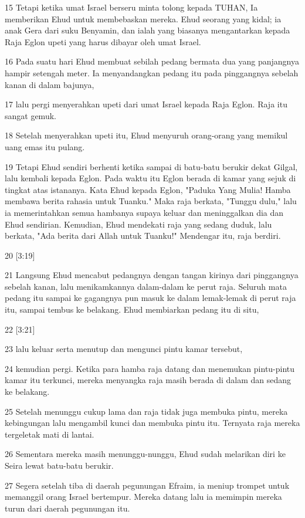 \par 15 Tetapi ketika umat Israel berseru minta tolong kepada TUHAN, Ia memberikan Ehud untuk membebaskan mereka. Ehud seorang yang kidal; ia anak Gera dari suku Benyamin, dan ialah yang biasanya mengantarkan kepada Raja Eglon upeti yang harus dibayar oleh umat Israel.
\par 16 Pada suatu hari Ehud membuat sebilah pedang bermata dua yang panjangnya hampir setengah meter. Ia menyandangkan pedang itu pada pinggangnya sebelah kanan di dalam bajunya,
\par 17 lalu pergi menyerahkan upeti dari umat Israel kepada Raja Eglon. Raja itu sangat gemuk.
\par 18 Setelah menyerahkan upeti itu, Ehud menyuruh orang-orang yang memikul uang emas itu pulang.
\par 19 Tetapi Ehud sendiri berhenti ketika sampai di batu-batu berukir dekat Gilgal, lalu kembali kepada Eglon. Pada waktu itu Eglon berada di kamar yang sejuk di tingkat atas istananya. Kata Ehud kepada Eglon, "Paduka Yang Mulia! Hamba membawa berita rahasia untuk Tuanku." Maka raja berkata, "Tunggu dulu," lalu ia memerintahkan semua hambanya supaya keluar dan meninggalkan dia dan Ehud sendirian. Kemudian, Ehud mendekati raja yang sedang duduk, lalu berkata, "Ada berita dari Allah untuk Tuanku!" Mendengar itu, raja berdiri.
\par 20 [3:19]
\par 21 Langsung Ehud mencabut pedangnya dengan tangan kirinya dari pinggangnya sebelah kanan, lalu menikamkannya dalam-dalam ke perut raja. Seluruh mata pedang itu sampai ke gagangnya pun masuk ke dalam lemak-lemak di perut raja itu, sampai tembus ke belakang. Ehud membiarkan pedang itu di situ,
\par 22 [3:21]
\par 23 lalu keluar serta menutup dan mengunci pintu kamar tersebut,
\par 24 kemudian pergi. Ketika para hamba raja datang dan menemukan pintu-pintu kamar itu terkunci, mereka menyangka raja masih berada di dalam dan sedang ke belakang.
\par 25 Setelah menunggu cukup lama dan raja tidak juga membuka pintu, mereka kebingungan lalu mengambil kunci dan membuka pintu itu. Ternyata raja mereka tergeletak mati di lantai.
\par 26 Sementara mereka masih menunggu-nunggu, Ehud sudah melarikan diri ke Seira lewat batu-batu berukir.
\par 27 Segera setelah tiba di daerah pegunungan Efraim, ia meniup trompet untuk memanggil orang Israel bertempur. Mereka datang lalu ia memimpin mereka turun dari daerah pegunungan itu.
